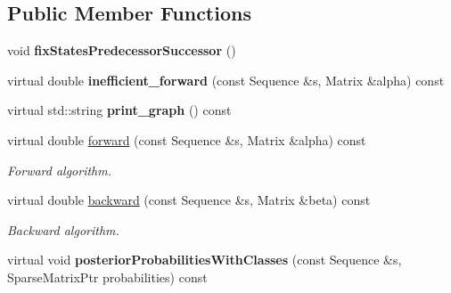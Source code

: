 \subsection*{Public Member Functions}
\begin{DoxyCompactItemize}
\item 
\mbox{\label{classtops_1_1GeneralizedHiddenMarkovModel_acbe3287fb655a591d39908680e0fbc07}} 
void {\bfseries fix\+States\+Predecessor\+Successor} ()
\item 
\mbox{\label{classtops_1_1GeneralizedHiddenMarkovModel_a2cfc12de31de7744a5e08aa28f0cb220}} 
virtual double {\bfseries inefficient\+\_\+forward} (const Sequence \&s, Matrix \&alpha) const
\item 
\mbox{\label{classtops_1_1GeneralizedHiddenMarkovModel_a7e7f9b05017d842f85efe10f52b4a0a0}} 
virtual std\+::string {\bfseries print\+\_\+graph} () const
\item 
\mbox{\label{classtops_1_1GeneralizedHiddenMarkovModel_a58c2de32d633890c97dee00301d5534c}} 
virtual double \hyperlink{classtops_1_1GeneralizedHiddenMarkovModel_a58c2de32d633890c97dee00301d5534c}{forward} (const Sequence \&s, Matrix \&alpha) const
\begin{DoxyCompactList}\small\item\em Forward algorithm. \end{DoxyCompactList}\item 
\mbox{\label{classtops_1_1GeneralizedHiddenMarkovModel_a073afb87466f0fc9b2fc52e94bae9269}} 
virtual double \hyperlink{classtops_1_1GeneralizedHiddenMarkovModel_a073afb87466f0fc9b2fc52e94bae9269}{backward} (const Sequence \&s, Matrix \&beta) const
\begin{DoxyCompactList}\small\item\em Backward algorithm. \end{DoxyCompactList}\item 
\mbox{\label{classtops_1_1GeneralizedHiddenMarkovModel_a9c708d79292d082a2a1c0618d662fad7}} 
virtual void {\bfseries posterior\+Probabilities\+With\+Classes} (const Sequence \&s, Sparse\+Matrix\+Ptr probabilities) const

\end{DoxyCompactItemize}
